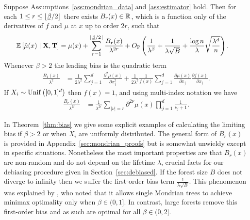 \begin{theorem}%
  \label{thm:bias}
  Suppose Assumptions~\ref{ass:mondrian_data} and \ref{ass:estimator} hold.
  Then for each $1 \leq r \leq \lfloor \flbeta / 2 \rfloor$ there exists
  $B_r(x) \in \mathbb{R}$, which is a function only of
  the derivatives of $f$ and $\mu$ at $x$ up to order $2r$,
  such that
  \begin{align*}
    \E \left[ \hat \mu(x) \mid \bX, \bT \right]
    &=
    \mu(x)
    + \sum_{r=1}^{\lfloor \flbeta / 2 \rfloor}
    \frac{B_r(x)}{\lambda^{2r}}
    + O_\P \left(
      \frac{1}{\lambda^\beta}
      + \frac{1}{\lambda \sqrt B}
      + \frac{\log n}{\lambda} \sqrt{\frac{\lambda^d}{n}}
    \right).
  \end{align*}
  Whenever $\beta > 2$ the leading bias is the quadratic term
  \begin{align*}
    \frac{B_1(x)}{\lambda^2}
    &=
    \frac{1}{2 \lambda^2}
    \sum_{j=1}^d \frac{\partial^2 \mu(x)}{\partial x_j^2}
    + \frac{1}{2 \lambda^2}
    \frac{1}{f(x)}
    \sum_{j=1}^{d} \frac{\partial \mu(x)}{\partial x_j}
    \frac{\partial f(x)}{\partial x_j}.
  \end{align*}
  If $X_i \sim \operatorname{Unif}\big([0,1]^d\big)$ then $f(x) = 1$,
  and using multi-index notation we have
  \begin{align*}
    \frac{B_r(x)}{\lambda^{2r}}
    &=
    \frac{1}{\lambda^{2r}}
    \sum_{|\nu|=r}
    \partial^{2 \nu} \mu(x)
    \prod_{j=1}^d
    \frac{1}{\nu_j + 1}.
  \end{align*}
\end{theorem}

In Theorem~\ref{thm:bias} we give some explicit examples
of calculating the limiting bias if $\beta > 2$
or when $X_i$ are uniformly distributed.
The general form of $B_r(x)$ is provided in
Appendix~\ref{sec:mondrian_proofs}
but is somewhat unwieldy except
in specific situations.
Nonetheless the most important properties are that $B_r(x)$
are non-random and
do not depend on the lifetime $\lambda$,
crucial facts for our debiasing procedure given in
Section~\ref{sec:debiased}.
If the forest size $B$ does not diverge to infinity
then we suffer the first-order bias term $\frac{1}{\lambda \sqrt B}$.
This phenomenon was explained by \citet{mourtada2020minimax},
who noted that it allows single Mondrian trees to achieve
minimax optimality only when $\beta \in (0, 1]$.
In contrast, large forests remove this first-order bias
and as such are optimal for all $\beta \in (0, 2]$.

